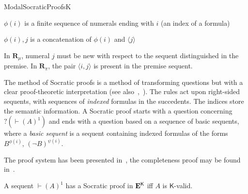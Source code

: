\begin{entry}{ModalSocraticProofsK}
\begin{calculus}
\begin{center}
\bigskip

$\phi(i)$ is a finite sequence of numerals ending with $i$ (an index of a formula)

$\phi(i), j$ is a concatenation of $\phi(i)$ and $\langle j \rangle$
\end{center}

\bigskip

In $\mathbf{R}_\mu$, numeral $j$ must be new with respect to the sequent distinguished in the premise. In $\mathbf{R}_\pi$, the pair $\langle i, j \rangle$ is present in the premise sequent.

\end{calculus}

\begin{clarifications}
The method of Socratic proofs is a method of transforming questions but with a
clear proof-theoretic interpretation (see
also~,~). The rules act upon
right-sided sequents, with sequences of \textit{indexed} formulas in the
succedents. The indices store the semantic information. A Socratic proof starts
with a question concerning $?(\vdash (A)^1)$ and ends with a question based on a
sequence of basic sequents, where a \textit{basic sequent} is a sequent
containing indexed formulas of the forms $B^{\phi(i)}$, $(\lnot B)^{\psi(i)}$.
\end{clarifications}

\begin{history}
The proof system has been presented in~\cite{DLJ:2004}, the completeness proof may be found in~\cite{DLJ:2007}.
\end{history}

\begin{technicalities}
A sequent $\vdash (A)^1$ has a Socratic proof in $\mathbf{E}^\mathsf{K}$ iff $A$ is $\mathsf{K}$-valid.
\end{technicalities}

\end{entry}
